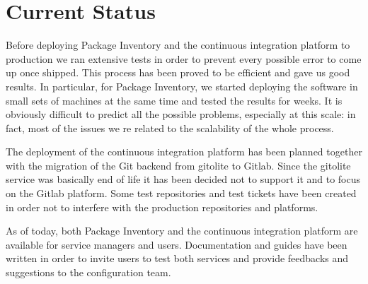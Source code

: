 \section{Current Status}

Before deploying Package Inventory and the continuous integration platform
to production we ran extensive tests in order to prevent every possible
error to come up once shipped. This process has been proved to be
efficient and gave us good results. In particular, for Package Inventory,
we started deploying the software in small sets of machines at the same
time and tested the results for weeks. It is obviously difficult to
predict all the possible problems, especially at this scale: in fact, most
of the issues we re related to the scalability of the whole process.

The deployment of the continuous integration platform has been planned
together with the migration of the Git backend from gitolite to Gitlab.
Since the gitolite service was basically end of life it has been decided
not to support it and to focus on the Gitlab platform. Some test
repositories and test tickets have been created in order not to interfere
with the production repositories and platforms.

As of today, both Package Inventory and the continuous integration
platform are available for service managers and users. Documentation and
guides have been written in order to invite users to test both services
and provide feedbacks and suggestions to the configuration team.
